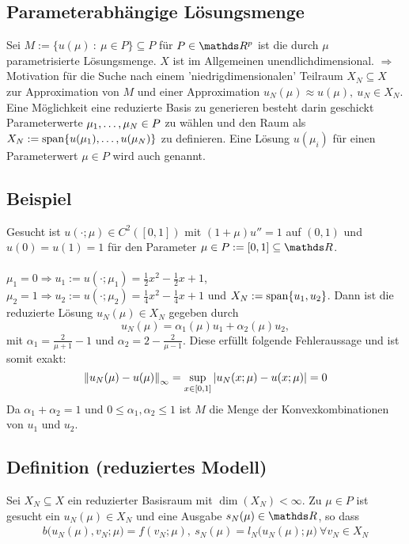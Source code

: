 \subsection{Parameterabhängige Lösungsmenge}
\label{sub:para_menge}
Sei $M :=\{u(\mu)~:~\mu\in P\}\subseteq P$ für $P\in \R^p$ ist die durch $\mu$ parametrisierte Lösungsmenge.
$X$ ist im Allgemeinen unendlichdimensional.
$\Rightarrow$ Motivation für die Suche nach einem 'niedrigdimensionalen' Teilraum $X_N\subseteq X$ zur Approximation von $M$ und einer Approximation $u_N(\mu) \approx u(\mu),~ u_N\in X_N$.
Eine Möglichkeit eine reduzierte Basis zu generieren besteht darin geschickt Parameterwerte $\mu_1, \dots ,\mu_N\in P$ zu wählen und den Raum als $X_N := \operatorname{span}\{u(\mu_1), \dots ,u(\mu_N)\}$ zu definieren.
Eine Lösung $u(\mu_i)$ für einen Parameterwert $\mu\in P$ wird auch  genannt.

\subsection{Beispiel}
\label{sub:beispiel_1}
Gesucht ist $u(\cdot;\mu) \in C^2([0,1])$ mit $(1+\mu)u'' = 1$ auf $(0,1)$ und $u(0)=u(1)=1$ für den Parameter $\mu\in P:= [0,1]\subseteq \R$.\\
\\
$\mu_1 = 0 \Rightarrow u_1 := u(\cdot;\mu_1) = \frac{1}{2} x^2- \frac{1}{2}x +1$, $\mu_2 = 1 \Rightarrow u_2 := u(\cdot;\mu_2) = \frac{1}{4} x^2- \frac{1}{4}x +1$ und $X_N := \operatorname{span}\{u_1,u_2\}$.
Dann ist die reduzierte Lösung $u_N(\mu)\in X_N$ gegeben durch
\[
u_N(\mu) = \alpha_1(\mu)u_1 +\alpha_2(\mu) u_2,
\]
mit $\alpha_1 = \frac{2}{\mu+1}-1$ und $\alpha_2 = 2-\frac{2}{\mu-1}$.
Diese erfüllt folgende Fehleraussage und ist somit exakt:
\[
\left\Vert u_N(\mu)-u(\mu)\right\Vert_\infty = \sup\limits_{x\in[0,1]} \left\vert u_N(x;\mu)-u(x;\mu)\right\vert = 0
\]
Da $\alpha_1 + \alpha_2 = 1$ und $0\le \alpha_1,\alpha_2\le 1$ ist $M$ die Menge der Konvexkombinationen von $u_1$ und $u_2$.

\subsection{Definition (reduziertes Modell)}
\label{sub:reduziertes_modell}
Sei $X_N\subseteq X$ ein reduzierter Basisraum mit $\dim(X_N)<\infty$.
Zu $\mu\in P$ ist gesucht ein $u_N(\mu)\in X_N$ und eine Ausgabe $s_N(\mu)\in \R$, so dass
\begin{align}
b\big(u_N(\mu),v_N;\mu\big) = f(v_N;\mu),~ s_N(\mu) = l_N\big(u_N(\mu);\mu\big) ~ \forall v_N\in X_N
\end{align}

